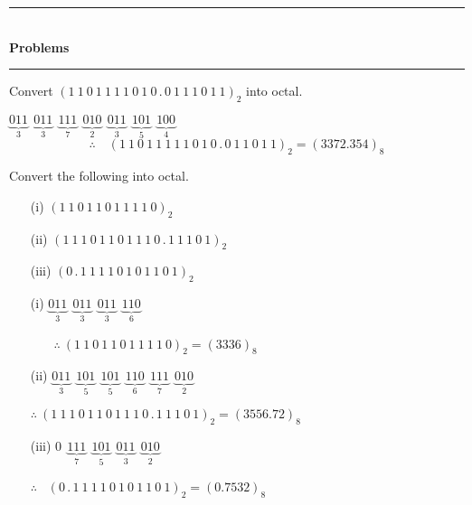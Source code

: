 \begin{center}
\rule{4cm}{1pt}\\
{\bf\Large Problems}\\[-3pt]
\rule{4cm}{1pt}
\end{center}

\begin{problem}\label{prob5.18}
Convert $(1~1~0~1~1~1~1~0~1~0\,.\,0~1~1~1~0~1~1)_{2}$ into octal.
\end{problem}

\begin{solution}
$\underbrace{011}_{3} \ \ \underbrace{011}_{3} \ \ \underbrace{111}_{7} \ \ \underbrace{010}_{2} \ \ \underbrace{011}_{3} \ \ \underbrace{101}_{5} \ \ \underbrace{100}_{4}$
$$
\therefore\quad (1~1~0~1~1~1~1~1~0~1~0\,.\,0~1~1~0~1~1)_{2}=(3372.354)_{8}
$$
\end{solution}

\begin{problem}\label{prob5.19}
Convert the following into octal.
\begin{itemize}
\item[(i)] $(1~1~0~1~1~0~1~1~1~1~0)_{2}$

\item[(ii)] $(1~1~1~0~1~1~0~1~1~1~0\,.\,1~1~1~0~1)_{2}$

\item[(iii)] $(0\,.\,1~1~1~1~0~1~0~1~1~0~1)_{2}$
\end{itemize}
\end{problem}

\begin{solution}
\begin{itemize}
\item[(i)] $\underbrace{011}_{3} \ \ \underbrace{011}_{3} \ \ \underbrace{011}_{3} \ \ \underbrace{110}_{6}$

\smallskip
\qquad\quad~~~ $\therefore~ (1~1~0~1~1~0~1~1~1~1~0)_{2}=(3336)_{8}$

\item[(ii)] $\underbrace{011}_{3} \ \ \underbrace{101}_{5} \ \ \underbrace{101}_{5} \ \ \underbrace{110}_{6} \ \ \underbrace{111}_{7} \ \ \underbrace{010}_{2}$

\smallskip
$\therefore~ (1~1~1~0~1~1~0~1~1~1~0\,.\,1~1~1~0~1)_{2}=(3556.72)_{8}$

\item[(iii)] $0 \ \ \underbrace{111}_{7} \ \ \underbrace{101}_{5} \ \ \underbrace{011}_{3} \ \ \underbrace{010}_{2}$

\smallskip
$\therefore$~ $(0\,.\,1~1~1~1~0~1~0~1~1~0~1)_{2}=(0.7532)_{8}$
\end{itemize}
\end{solution}

